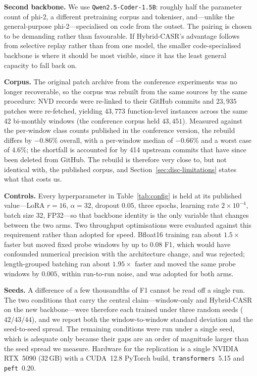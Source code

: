 \documentclass[a4paper,twoside]{article}
\begin{document}
\textbf{Second backbone.} We use \texttt{Qwen2.5-Coder-1.5B}: roughly half the parameter count of phi-2, a different pretraining corpus and tokeniser, and---unlike the general-purpose phi-2---specialised on code from the outset. The pairing is chosen to be demanding rather than favourable. If Hybrid-CASR's advantage follows from selective replay rather than from one model, the smaller code-specialised backbone is where it should be most visible, since it has the least general capacity to fall back on.

\textbf{Corpus.} The original patch archive from the conference experiments was no longer recoverable, so the corpus was rebuilt from the same sources by the same procedure: NVD records were re-linked to their GitHub commits and $23{,}935$ patches were re-fetched, yielding $43{,}773$ function-level instances across the same 42 bi-monthly windows (the conference corpus held $43{,}451$). Measured against the per-window class counts published in the conference version, the rebuild differs by $-0.86\%$ overall, with a per-window median of $-0.66\%$ and a worst case of $4.6\%$; the shortfall is accounted for by 414 upstream commits that have since been deleted from GitHub. The rebuild is therefore very close to, but not identical with, the published corpus, and Section~\ref{sec:disc-limitations} states what that costs us.

\textbf{Controls.} Every hyperparameter in Table~\ref{tab:config} is held at its published value---LoRA $r=16$, $\alpha=32$, dropout $0.05$, three epochs, learning rate $2\times10^{-4}$, batch size 32, FP32---so that backbone identity is the only variable that changes between the two arms. Two throughput optimisations were evaluated against this requirement rather than adopted for speed. Bfloat16 training ran about $1.5\times$ faster but moved fixed probe windows by up to $0.08$ F1, which would have confounded numerical precision with the architecture change, and was rejected; length-grouped batching ran about $1.95\times$ faster and moved the same probe windows by $0.005$, within run-to-run noise, and was adopted for both arms.

\textbf{Seeds.} A difference of a few thousandths of F1 cannot be read off a single run. The two conditions that carry the central claim---window-only and Hybrid-CASR on the new backbone---were therefore each trained under three random seeds ($42/43/44$), and we report both the window-to-window standard deviation and the seed-to-seed spread. The remaining conditions were run under a single seed, which is adequate only because their gaps are an order of magnitude larger than the seed spread we measure. Hardware for the replication is a single NVIDIA RTX~5090 (32\,GB) with a CUDA~12.8 PyTorch build, \texttt{transformers}~5.15 and \texttt{peft}~0.20.
\end{document}
